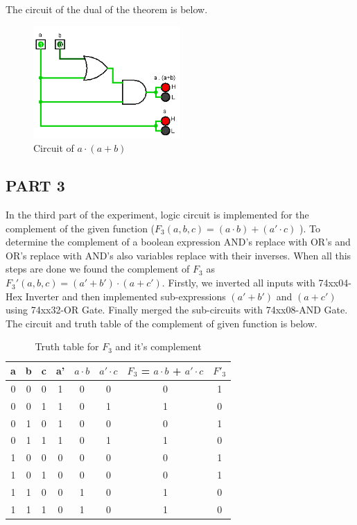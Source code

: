 \documentclass[pdftex,12pt,a4paper]{article}
\begin{document}
The circuit of the dual of the theorem is below.
\begin{figure}[ht]
	\centering
	\includegraphics[width=0.5\textwidth]{2_2.png}	
	\caption{Circuit of $a \cdot (a + b)$}
	\label{fig1}
\end{figure}

\subsection{PART 3}
In the third part of the experiment, logic circuit is implemented for the complement of the given function ($F_3(a,b,c) = (a \cdot b) + (a' \cdot c)$ ). To determine the complement of a boolean expression AND's replace with OR's and OR's replace with AND's also variables replace with their inverses. When all this steps are done we found the complement of $F_3$ as $F_3'(a,b,c) = (a' + b') \cdot (a + c')$. Firstly, we inverted all inputs with 74xx04-Hex Inverter and then implemented sub-expressions $(a' + b')$ and $(a + c')$ using 74xx32-OR Gate. Finally merged the sub-circuits with 74xx08-AND Gate.\\

The circuit and truth table of the complement of given function is below.

\begin{table}[h]
\centering
\begin{tabular}{|c|c|c|c|c|c|c|c|}
\hline
a & b & c & a' & $a \cdot b$ & $a' \cdot c$ & $F_{3}$ = $a \cdot b$ + $a' \cdot c$ & $F'_{3}$ \\ \hline
0 & 0 & 0 & 1  & 0     & 0      & 0                        & 1        \\ 
0 & 0 & 1 & 1  & 0     & 1      & 1                        & 0        \\ 
0 & 1 & 0 & 1  & 0     & 0      & 0                        & 1        \\ 
0 & 1 & 1 & 1  & 0     & 1      & 1                        & 0        \\ 
1 & 0 & 0 & 0  & 0     & 0      & 0                        & 1        \\ 
1 & 0 & 1 & 0  & 0     & 0      & 0                        & 1        \\
1 & 1 & 0 & 0  & 1     & 0      & 1                        & 0        \\ 
1 & 1 & 1 & 0  & 1     & 0      & 1                        & 0        \\ \hline
\end{tabular}
\caption{Truth table for $F_3$ and it's complement}
\label{fig3}
\end{table}
\end{document}

